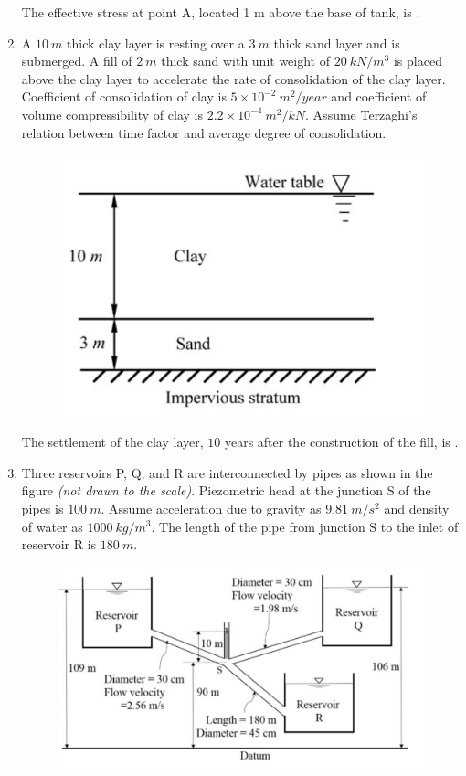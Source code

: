 \documentclass[journal]{IEEEtran}
\begin{document}
\begin{enumerate}
The effective stress  at point A, located 1 m above the base of tank, is \underline{\hspace{2cm}}. \hfill {}

\item A $10 \ m$ thick clay layer is resting over a $3 \ m$ thick sand layer and is submerged. A fill of $2 \ m$ thick sand with unit weight of $20 \ kN/m^3$ is placed above the clay layer to accelerate the rate of consolidation of the clay layer. Coefficient of consolidation of clay is $5 \times 10^{-2} \ m^2/year$ and coefficient of volume compressibility of clay is $2.2 \times 10^{-4} \ m^2/kN$. Assume Terzaghi's relation between time factor and average degree of consolidation.  


\begin{figure}[H]
    \centering
    \includegraphics[width=0.3\columnwidth]{figs/Q58.png} 
    \caption{}
    \label{fig:placeholder}
\end{figure}

The settlement  of the clay layer, $10$ years after the construction of the fill, is \underline{\hspace{2cm}}. \hfill {}


\item Three reservoirs P, Q, and R are interconnected by pipes as shown in the figure \textit{(not drawn to the scale)}. Piezometric head at the junction S of the pipes is $100 \ m$. Assume acceleration due to gravity as $9.81 \ m/s^2$ and density of water as $1000 \ kg/m^3$. The length of the pipe from junction S to the inlet of reservoir R is $180 \ m$. 

\begin{figure}[H]
    \centering
    \includegraphics[width=0.3\columnwidth]{figs/Q59.png} 
    \caption{}
    \label{fig:placeholder}
\end{figure}


\end{enumerate}
\end{document}
